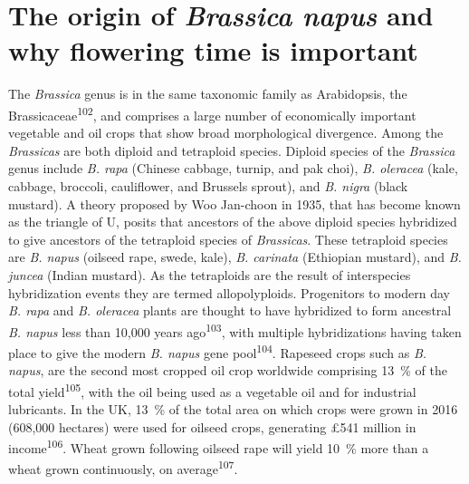 \documentclass[12pt,]{book}
\begin{document}
\section{\texorpdfstring{The origin of \emph{Brassica napus} and why
flowering time is
important}{The origin of Brassica napus and why flowering time is important}}\label{section:intro:brassica}

The \emph{Brassica} genus is in the same taxonomic family as
Arabidopsis, the Brassicaceae\textsuperscript{102}, and comprises a
large number of economically important vegetable and oil crops that show
broad morphological divergence. Among the \emph{Brassicas} are both
diploid and tetraploid species. Diploid species of the \emph{Brassica}
genus include \emph{B. rapa} (Chinese cabbage, turnip, and pak choi),
\emph{B. oleracea} (kale, cabbage, broccoli, cauliflower, and Brussels
sprout), and \emph{B. nigra} (black mustard). A theory proposed by Woo
Jan-choon in 1935, that has become known as the triangle of U, posits
that ancestors of the above diploid species hybridized to give ancestors
of the tetraploid species of \emph{Brassicas}. These tetraploid species
are \emph{B. napus} (oilseed rape, swede, kale), \emph{B. carinata}
(Ethiopian mustard), and \emph{B. juncea} (Indian mustard). As the
tetraploids are the result of interspecies hybridization events they are
termed allopolyploids. Progenitors to modern day \emph{B. rapa} and
\emph{B. oleracea} plants are thought to have hybridized to form
ancestral \emph{B. napus} less than 10,000 years
ago\textsuperscript{103}, with multiple hybridizations having taken
place to give the modern \emph{B. napus} gene pool\textsuperscript{104}.
Rapeseed crops such as \emph{B. napus}, are the second most cropped oil
crop worldwide comprising 13~\% of the total yield\textsuperscript{105},
with the oil being used as a vegetable oil and for industrial
lubricants. In the UK, 13~\% of the total area on which crops were grown
in 2016 (608,000 hectares) were used for oilseed crops, generating £541
million in income\textsuperscript{106}. Wheat grown following oilseed
rape will yield 10~\% more than a wheat grown continuously, on
average\textsuperscript{107}.
\end{document}
